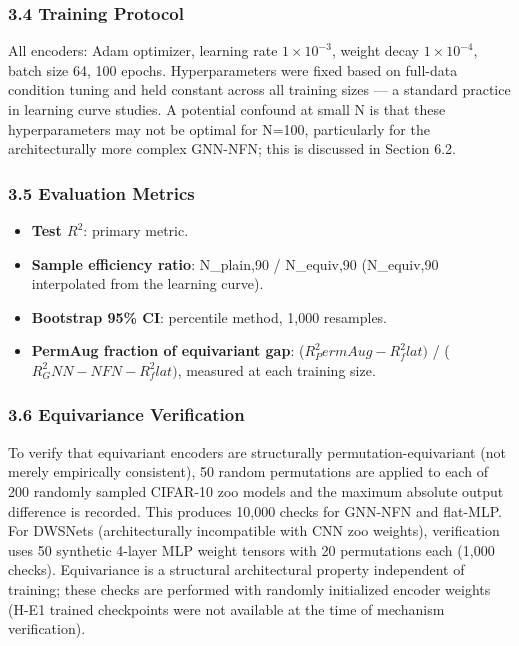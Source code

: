 \subsubsection{3.4 Training Protocol}

All encoders: Adam optimizer, learning rate $1\times 10^{-3}$, weight decay $1\times 10^{-4}$, batch size 64, 100 epochs. Hyperparameters were fixed based on full-data condition tuning and held constant across all training sizes --- a standard practice in learning curve studies. A potential confound at small N is that these hyperparameters may not be optimal for N=100, particularly for the architecturally more complex GNN-NFN; this is discussed in Section 6.2.

\subsubsection{3.5 Evaluation Metrics}

\begin{itemize}
\item \textbf{Test $R^2$}: primary metric.
\item \textbf{Sample efficiency ratio}: N\_plain,90 / N\_equiv,90 (N\_equiv,90 interpolated from the learning curve).
\item \textbf{Bootstrap 95\% CI}: percentile method, 1,000 resamples.
\item \textbf{PermAug fraction of equivariant gap}: ($R^{2}_PermAug - R^{2}_flat)$ / ($R^{2}_GNN-NFN - R^{2}_flat)$, measured at each training size.
\end{itemize}

\subsubsection{3.6 Equivariance Verification}

To verify that equivariant encoders are structurally permutation-equivariant (not merely empirically consistent), 50 random permutations are applied to each of 200 randomly sampled CIFAR-10 zoo models and the maximum absolute output difference is recorded. This produces 10,000 checks for GNN-NFN and flat-MLP. For DWSNets (architecturally incompatible with CNN zoo weights), verification uses 50 synthetic 4-layer MLP weight tensors with 20 permutations each (1,000 checks). Equivariance is a structural architectural property independent of training; these checks are performed with randomly initialized encoder weights (H-E1 trained checkpoints were not available at the time of mechanism verification).

